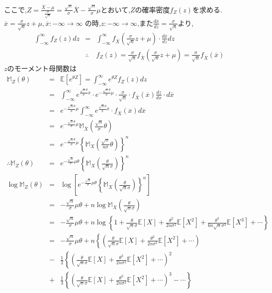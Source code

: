 \documentclass[12pt, platex,dvipdfmx]{jsarticle}
\begin{document}
ここで,$Z=\frac{\overline{X}-\mu}{\frac{\sigma}{\sqrt{n}}}=\frac{\sqrt{n}}{\sigma}\overline{X}-\frac{\sqrt{n}}{\sigma}\mu$とおいて,$Z$の確率密度$f_Z(z)$を求める.
$\overline{x}=\frac{\sigma}{\sqrt{n}} z+\mu, \overline{x}: -\infty \to \infty$ の時,$ z: -\infty \to \infty$,また$\frac{d\overline{x}}{dz}=\frac{\sigma}{\sqrt{n}}$より,
\begin{eqnarray*}
    \int_{-\infty}^{\infty} f_Z(z)dz&=&\int_{-\infty}^{\infty}f_{\overline{X}}\left(\frac{\sigma}{\sqrt{n}}z+\mu \right) \cdot \frac{ d \overline{x} }{dz} dz \\
    &\therefore&f_Z(z)=\frac{\sigma}{\sqrt{n}}f_{\overline{X}}\left(\frac{\sigma}{\sqrt{n}}z+\mu\right)=\frac{\sigma}{\sqrt{n}}f_{\overline{X}}(\overline{x})
\end{eqnarray*}
$z$のモーメント母関数は
\begin{eqnarray*}
    {\mathbb M}_Z(\theta)&=&\mathbb{E}[e^{\theta Z}]=\int^{\infty}_{-\infty}e^{\theta Z}f_Z(z)dz \\
    &=&\int^{\infty}_{-\infty}e^{\frac{\sqrt{n}\theta}{\sigma}\overline{x}} \cdot e^{-\frac{\sqrt{n}\theta}{\sigma}\mu} \cdot \frac{\sigma}{\sqrt{n}} \cdot f_{\overline{X}}(\overline{x})\frac{dz}{d \overline{x}} \cdot d \overline{x} \\
    &=&e^{-\frac{\sqrt{n}\theta}{\sigma}\mu} \int^{\infty}_{-\infty}e^{\frac{\sqrt{n}\theta}{\sigma}\overline{x}} \cdot f_{\overline{X}}(\overline{x}) d\overline{x} \\
    &=&e^{-\frac{\sqrt{n}\theta}{\sigma}\mu}  {\mathbb M}_{\overline{X}} \left(\frac{\sqrt{n}}{\sigma}\theta\right) \\
    &=&e^{-\frac{\sqrt{n}\theta}{\sigma}\mu}  \left\{ {\mathbb M}_X \left(\frac{\sqrt{n}}{n\sigma}\theta\right) \right\}^n \\
    \therefore {\mathbb M}_Z(\theta)&=&e^{-\frac{\sqrt{n}}{\sigma}\mu \theta} \left\{ {\mathbb M}_X \left(\frac{\theta}{\sqrt{n}\sigma}\right) \right\}^n \\
    \log {\mathbb M}_Z(\theta)&=&\log \left[ e^{-\frac{\sqrt{n}}{\sigma}\mu \theta} \left\{ {\mathbb M}_X \left(\frac{\theta}{\sqrt{n}\sigma}\right) \right\}^n \right] \\
    &=&-\frac{\sqrt{n}}{\sigma}\mu \theta + n\log {\mathbb M}_X \left(\frac{\theta}{\sqrt{n}\sigma}\right) \\
    &=&-\frac{\sqrt{n}}{\sigma}\mu \theta + n\log \left\{1+\frac{\theta}{\sqrt{n}\sigma}\mathbb{E}[X]+\frac{\theta^2}{2n\sigma^2}\mathbb{E}[X^2]+\frac{\theta^3}{6n\sqrt{n}\sigma^3}\mathbb{E}[X^3]+\cdots \right\} \\
    &=&-\frac{\sqrt{n}}{\sigma}\mu \theta + n\left\{\left(\frac{\theta}{\sqrt{n}\sigma}\mathbb{E}[X]+\frac{\theta^2}{2n\sigma^2}\mathbb{E}[X^2]+\cdots \right) \\
    &-& \frac{1}{2}\left\{\left(\frac{\theta}{\sqrt{n}\sigma}\mathbb{E}[X]+\frac{\theta^2}{2n\sigma^2}\mathbb{E}[X^2]+\cdots \right)^2 \\
    &+& \frac{1}{3}\left\{\left(\frac{\theta}{\sqrt{n}\sigma}\mathbb{E}[X]+\frac{\theta^2}{2n\sigma^2}\mathbb{E}[X^2]+\cdots \right)^3 - \cdots \right\}
\end{eqnarray*}
\end{document}
